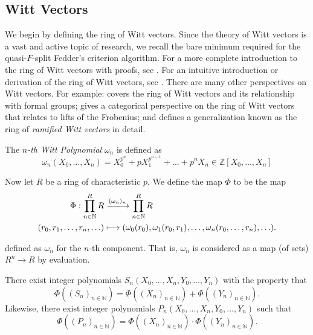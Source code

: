 
\subsection{Witt Vectors}

We begin by defining the ring of Witt vectors. 
Since the theory of Witt vectors is a vast and active topic of research,
we recall the bare minimum 
required for the quasi-\(F\)-split Fedder's criterion algorithm.
For a more complete introduction to the ring of Witt vectors with proofs, 
see \cite{rabinoff-2014-witt-vec}.
For an intuitive introduction or derivation of the ring of Witt vectors, see
\cite{kim-2017-witt-vec}.
There are many other perspectives on Witt vectors. 
For example:
\cite[Chapter~17]{hazewinkel-1978-formal-groups} covers the ring of Witt vectors
and its relationship with formal groups; 
\cite{kedlaya-2021-prismatic} gives a categorical perspective on the ring of Witt vectors
that relates to lifts of the Frobenius; and
\cite[Chapter~1]{schneider-2017-galois-rep-phi-gamma} defines a generalization
known as the ring of \textit{ramified Witt vectors} in detail.

\begin{defn}
	The \textit{\(n\)-th Witt Polynomial} \(\omega_{n}\) is defined as
	\[
		\omega_{n}(X_{0}, \ldots, X_{n}) = X_{0}^{p^{n}} + pX_{1}^{p^{n-1}} + \ldots + p^{n}X_{n}
        \in \mathbb{Z}[X_{0}, \ldots, X_{n}]
	\] 
    
\end{defn}

\noindent Now let \(R\) be a ring of characteristic \(p\).
We define the map \(\Phi\) to be the map 
\begin{align*}
    \Phi : \prod_{n \in \mathbb{N}}^{R} R  
    &\xlongrightarrow{(\omega_{n})_{n}} \prod_{n \in \mathbb{N}}^{R} R \\
    (r_{0}, r_{1}, \ldots, r_{n}, \ldots) &\longmapsto 
    (\omega_{0}(r_{0}), \omega_{1}(r_{0}, r_{1}), 
    \ldots, \omega_{n}(r_{0}, \ldots, r_{n}), \ldots)
.\end{align*}

defined as \(\omega_{n}\) for the \(n\)-th component.
That is, \(\omega_{n}\) is considered as a 
map (of sets) \(R^{n} \xrightarrow{} R\) by
evaluation.

\begin{lem}
	There exist integer polynomials 
	\(S_n(X_{0}, \ldots, X_{n}, Y_{0}, \ldots, Y_{n})\) 
	with the property that 
	\[
		\Phi((S_{n})_{n \in \mathbb{N}}) =
		\Phi((X_{n})_{n \in \mathbb{N}}) 
		+ \Phi((Y_{n})_{n \in \mathbb{N}})
	.\] 
	Likewise, there exist integer polynomials 
	\(P_{n}(X_{0}, \ldots, X_{n}, Y_{0}, \ldots, Y_{n})\)
	such that
	\[
		\Phi((P_{n})_{n \in \mathbb{N}}) =
		\Phi((X_{n})_{n \in \mathbb{N}}) 
		\cdot \Phi((Y_{n})_{n \in \mathbb{N}})
	.\] 
\end{lem}

